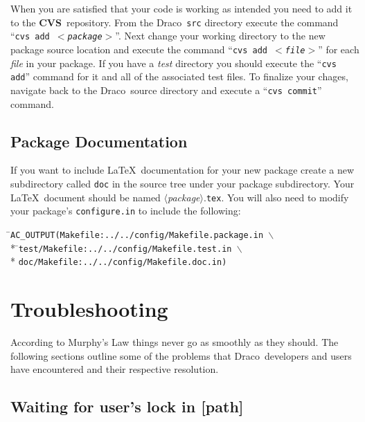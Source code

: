 \documentclass[11pt]{nmemo}
\newcommand{\comp}[1]{\normalfont\normalsize\texttt{#1}}
\newcommand{\draco}{{\normalfont\sffamily Draco}}
\newcommand{\cvs}{{\normalfont\bfseries CVS}}
\begin{document}
When you are satisfied that your code is working as intended you need
to add it to the \cvs\ repository.  From the \draco\ \comp{src}
directory execute the command ``\comp{cvs add $<$\emph{package}$>$}''.
Next change your working directory to the new package source location
and execute the command ``\comp{cvs add $<$\emph{file}$>$}'' for each
\emph{file} in your package.  If you have a \emph{test} directory you
should execute the ``\comp{cvs add}'' command for it and all of the
associated test files.  To finalize your chages, navigate back to the
\draco\ source directory and execute a ``\comp{cvs commit}'' command.

\subsection{Package Documentation}

If you want to include \LaTeX\ documentation for your new package
create a new subdirectory called \comp{doc} in the source tree under
your package subdirectory.  Your \LaTeX\ document should be named
$\langle$\emph{package}$\rangle$.\comp{tex}.  You will also need to
modify your package's \comp{configure.in} to include the following:

\begin{tabbing}
\hspace{0.5in}\=\comp{AC\_OUTPUT(Makefile:../../config/Makefile.package.in $\backslash$} \\*
\>\hspace{0.5in}\=\comp{test/Makefile:../../config/Makefile.test.in $\backslash$} \\*
\>\>\comp{doc/Makefile:../../config/Makefile.doc.in)}
\end{tabbing}


\section{Troubleshooting}

According to Murphy's Law things never go as smoothly as they should.
The following sections outline some of the problems that \draco\ 
developers and users have encountered and their respective resolution.

\subsection{Waiting for user's lock in [path]}
\end{document}
